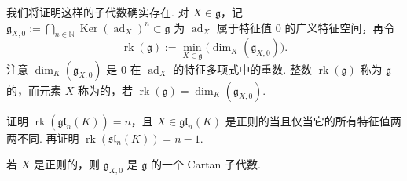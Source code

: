 我们将证明这样的子代数确实存在. 对 $X\in\mathfrak g$，记
$\mathfrak g_{X,0}:=\bigcap_{n\in\mathbb N}\operatorname{Ker}(\operatorname{ad}_{X})^{n}\subset\mathfrak g$
为 $\operatorname{ad}_{X}$ 属于特征值 $0$ 的广义特征空间，再令
\[
\operatorname{rk}(\mathfrak g):=\min_{X\in\mathfrak g}\bigl(\dim_{K}(\mathfrak g_{X,0})\bigr).
\]
注意 $\dim_{K}(\mathfrak g_{X,0})$ 是 $0$ 在 $\operatorname{ad}_{X}$ 的特征多项式中的重数. 整数 $\operatorname{rk}(\mathfrak g)$ 称为 $\mathfrak g$ 的，而元素 $X$ 称为的，若 $\operatorname{rk}(\mathfrak g)=\dim_{K}(\mathfrak g_{X,0})$.
\begin{exercise*}
证明 $\operatorname{rk}(\mathfrak{gl}_{n}(K))=n$，且 $X\in\mathfrak{gl}_{n}(K)$ 是正则的当且仅当它的所有特征值两两不同. 再证明 $\operatorname{rk}(\mathfrak{sl}_{n}(K))=n-1$.
\end{exercise*}
\begin{proposition*}
若 $X$ 是正则的，则 $\mathfrak g_{X,0}$ 是 $\mathfrak g$ 的一个 Cartan 子代数.
\end{proposition*}
